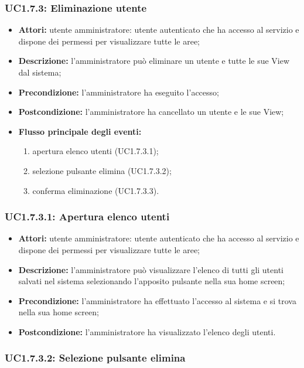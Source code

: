 \subsubsection{UC1.7.3: Eliminazione utente}

\begin{itemize}
    \item \textbf{Attori:} utente amministratore: utente autenticato che ha accesso al servizio e dispone dei permessi per visualizzare tutte le aree;
    \item \textbf{Descrizione:} l'amministratore può eliminare un utente e tutte le sue View dal sistema;
    \item \textbf{Precondizione:} l'amministratore ha eseguito l'accesso;
    \item \textbf{Postcondizione:} l'amministratore ha cancellato un utente e le sue View;
    \item \textbf{Flusso principale degli eventi:}
    \begin{enumerate}
        \item apertura elenco utenti (UC1.7.3.1);
        \item selezione pulsante elimina (UC1.7.3.2);
        \item conferma eliminazione (UC1.7.3.3).
    \end{enumerate}
\end{itemize}

\subsubsection{UC1.7.3.1: Apertura elenco utenti}

\begin{itemize}
    \item \textbf{Attori:} utente amministratore: utente autenticato che ha accesso al servizio e dispone dei permessi per visualizzare tutte le aree;
    \item \textbf{Descrizione:} l'amministratore può visualizzare l'elenco di tutti gli utenti salvati nel sistema selezionando l'apposito pulsante nella sua home screen;
    \item \textbf{Precondizione:} l'amministratore ha effettuato l'accesso al sistema e si trova nella sua home screen;
    \item \textbf{Postcondizione:} l'amministratore ha visualizzato l'elenco degli utenti.
\end{itemize}

\subsubsection{UC1.7.3.2: Selezione pulsante elimina}

